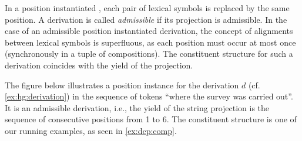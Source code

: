 \documentclass[../../document.tex]{subfiles}
\begin{document}
    In a position instantiated , each pair of lexical symbols is replaced by the same position.
    A derivation is called \emph{admissible} if its  projection is admissible.
    In the case of an admissible position instantiated derivation, the concept of alignments between lexical symbols is superfluous, as each position must occur at most once (synchronously in a tuple of compositions).
    The constituent structure for such a derivation coincides with the yield of the  projection.

    \vspace{\baselineskip}

    \parexample
    The figure below illustrates a position instance for the derivation \(d\) (cf.\@ \cref{ex:hg:derivation}) in the sequence of tokens ``where the survey was carried out''.
    It is an admissible derivation, i.e.\@, the yield of the string projection is the sequence of consecutive positions from 1 to 6.
    The constituent structure is one of our running examples, as seen in \cref{ex:dcp:comp}.

    \null\hfill
    \hfill\exampleqed
\end{document}
